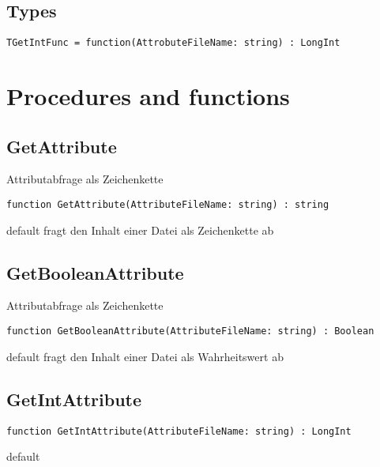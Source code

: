 \subsection{Types}
\label{sysfstypes}

\begin{verbatim}
TGetIntFunc = function(AttrobuteFileName: string) : LongInt
\end{verbatim}
\label{computer:sysfs:tgetintfunc}


\section{Procedures and functions}
\label{sysfsfunctions}
\subsection{GetAttribute}
\label{computer:sysfs:getattribute}
\begin{FPCList}
\Synopsis
Attributabfrage als Zeichenkette\Declaration 

\begin{verbatim}
function GetAttribute(AttributeFileName: string) : string
\end{verbatim}
\Visibility
default
\Description
fragt den Inhalt einer Datei als Zeichenkette ab\end{FPCList}
\subsection{GetBooleanAttribute}
\label{computer:sysfs:getbooleanattribute}
\begin{FPCList}
\Synopsis
Attributabfrage als Zeichenkette\Declaration 

\begin{verbatim}
function GetBooleanAttribute(AttributeFileName: string) : Boolean
\end{verbatim}
\Visibility
default
\Description
fragt den Inhalt einer Datei als Wahrheitswert ab\end{FPCList}
\subsection{GetIntAttribute}
\label{computer:sysfs:getintattribute}
\begin{FPCList}
\Declaration 

\begin{verbatim}
function GetIntAttribute(AttributeFileName: string) : LongInt
\end{verbatim}
\Visibility
default
\end{FPCList}
